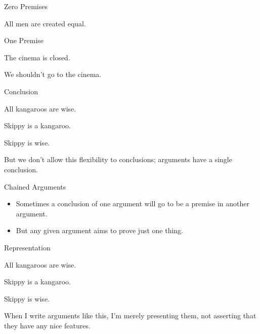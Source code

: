 \documentclass[
  ignorenonframetext,
]{beamer}
\providecommand{\tightlist}{%
  \setlength{\itemsep}{0pt}\setlength{\parskip}{0pt}}
\renewcommand{\,}{\text{, }}
\renewenvironment*{quote}	
	{\list{}{\rightmargin   \leftmargin} \item } 	
	{\endlist }
\newcommand{\DisplayArg}[2]{
\begin{enumerate}
{#1}
\end{enumerate}
\vspace{-6pt}
\hrulefill

\begin{quote}
{\normalfont #2}
\end{quote}
\vspace{12pt}
}
\begin{document}
\begin{frame}{Zero Premises}
\protect\hypertarget{zero-premises}{}

\hrulefill \begin{quote} {\normalfont All men are created equal.} \end{quote} \vspace{12pt}

\end{frame}

\begin{frame}{One Premise}
\protect\hypertarget{one-premise}{}

\DisplayArg{ \item The cinema is closed. } { We shouldn't go to the cinema. }

\end{frame}

\begin{frame}{Conclusion}
\protect\hypertarget{conclusion-1}{}

\DisplayArg{ \item All kangaroos are wise. \item Skippy is a kangaroo. } { Skippy is wise. }

But we don't allow this flexibility to conclusions; arguments have a
single conclusion.

\end{frame}

\begin{frame}{Chained Arguments}
\protect\hypertarget{chained-arguments}{}

\begin{itemize}
\tightlist
\item
  Sometimes a conclusion of one argument will go to be a premise in
  another argument.
\item
  But any given argument aims to prove just one thing.
\end{itemize}

\end{frame}

\begin{frame}{Representation}
\protect\hypertarget{representation}{}

\DisplayArg{ \item All kangaroos are wise. \item Skippy is a kangaroo. } { Skippy is wise. }

When I write arguments like this, I'm merely presenting them, not
asserting that they have any nice features.

\end{frame}
\end{document}
